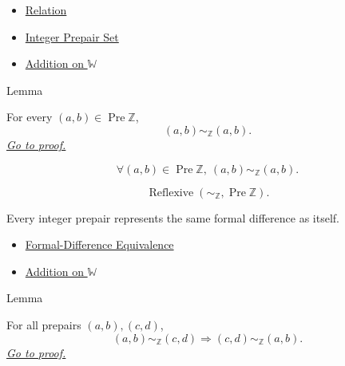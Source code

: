 \begin{dependencies}
\begin{itemize}
  \item \hyperref[def:relation]{Relation}
  \item \hyperref[def:integer-prepair-set]{Integer Prepair Set}
  \item \hyperref[def:addition-on-w]{Addition on $\mathbb{W}$}
\end{itemize}
\end{dependencies}

\begin{lemmabox}{Lemma}
\begin{lemma}
\label{lem:formal-difference-equivalence-reflexive}
For every $(a,b)\in\operatorname{Pre}\mathbb{Z}$,
\[
(a,b)\sim_{\mathbb{Z}}(a,b).
\]
\hyperref[prf:formal-difference-equivalence-reflexive]{\textit{Go to proof.}}
\end{lemma}
\end{lemmabox}

\begin{remark*}
\[
\forall (a,b)\in\operatorname{Pre}\mathbb{Z},\ (a,b)\sim_{\mathbb{Z}}(a,b).
\]
\end{remark*}

\begin{remark*}
\[
\operatorname{Reflexive}(\sim_{\mathbb{Z}},\operatorname{Pre}\mathbb{Z}).
\]
\end{remark*}

\begin{remark*}[Interpretation]
Every integer prepair represents the same formal difference as itself.
\end{remark*}

\begin{dependencies}
\begin{itemize}
  \item \hyperref[def:formal-difference-equivalence]{Formal-Difference Equivalence}
  \item \hyperref[def:addition-on-w]{Addition on $\mathbb{W}$}
\end{itemize}
\end{dependencies}

\begin{lemmabox}{Lemma}
\begin{lemma}
\label{lem:formal-difference-equivalence-symmetric}
For all prepairs $(a,b),(c,d)$,
\[
(a,b)\sim_{\mathbb{Z}}(c,d)
\Longrightarrow
(c,d)\sim_{\mathbb{Z}}(a,b).
\]
\hyperref[prf:formal-difference-equivalence-symmetric]{\textit{Go to proof.}}
\end{lemma}
\end{lemmabox}

